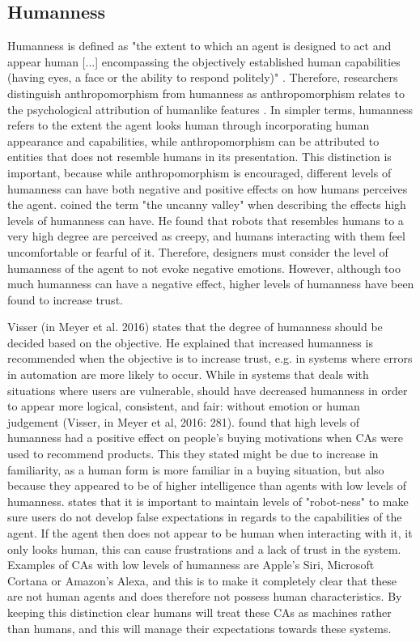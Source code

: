 \vspace{2,5mm}

\subsection{Humanness}
Humanness is defined as "the extent to which an agent is designed to act and appear human [...] encompassing the objectively established human capabilities (having eyes, a face or the ability to respond politely)" \citep{Meyer2016}. Therefore, researchers distinguish anthropomorphism from humanness as anthropomorphism relates to the psychological attribution of humanlike features \citep{Epley2007,Mori1970,Nass2000}. In simpler terms, humanness refers to the extent the agent looks human through incorporating human appearance and capabilities, while anthropomorphism can be attributed to entities that does not resemble humans in its presentation. This distinction is important, because while anthropomorphism is encouraged, different levels of humanness can have both negative and positive effects on how humans perceives the agent. \cite{Mori1970} coined the term "the uncanny valley" when describing the effects high levels of humanness can have. He found that robots that resembles humans to a very high degree are perceived as creepy, and humans interacting with them feel uncomfortable or fearful of it. Therefore, designers must consider the level of humanness of the agent to not evoke negative emotions. However, although too much humanness can have a negative effect, higher levels of humanness have been found to increase trust.

Visser (in Meyer et al. 2016) states that the degree of humanness should be decided based on the objective. He explained that increased humanness is recommended when the objective is to increase trust, e.g. in systems where errors in automation are more likely to occur. While in systems that deals with situations where users are vulnerable, should have decreased humanness in order to appear more logical, consistent, and fair: without emotion or human judgement (Visser, in Meyer et al, 2016: 281). \cite{Terada2015} found that high levels of humanness had a positive effect on people's buying motivations when CAs were used to recommend products. This they stated might be due to increase in familiarity, as a human form is more familiar in a buying situation, but also because they appeared to be of higher intelligence than agents with low levels of humanness. \cite{Disalvo2002} states that it is important to maintain levels of "robot-ness" to make sure users do not develop false expectations in regards to the capabilities of the agent. If the agent then does not appear to be human when interacting with it, it only looks human, this can cause frustrations and a lack of trust in the system. Examples of CAs with low levels of humanness are Apple's Siri, Microsoft Cortana or Amazon's Alexa, and this is to make it completely clear that these are not human agents and does therefore not possess human characteristics. By keeping this distinction clear humans will treat these CAs as machines rather than humans, and this will manage their expectations towards these systems.

